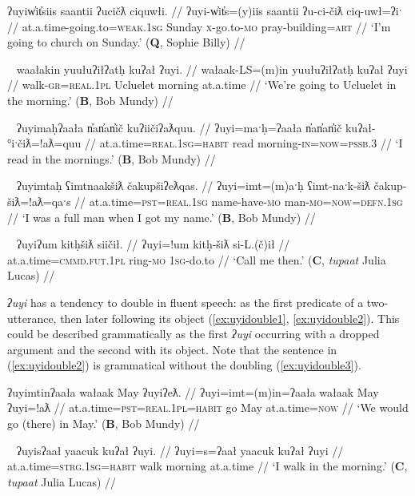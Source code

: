 \ex \label{ex:uyin}
\begingl
\glpreamble ʔuyiw̓it̓siis saantii ʔucičƛ ciquwłi. //
\gla ʔuyi-w̓it̓s=(y)iis saantii ʔu-ci-čiƛ ciq-uwł=ʔiˑ //
\glb at.a.time-going.to=\textsc{weak.1sg} Sunday \textsc{x}-go.to-\textsc{mo} pray-building=\textsc{art} //
\glft `I'm going to church on Sunday.' (\textbf{Q}, Sophie Billy) //
\endgl
\xe

\ex~ \label{ex:uyiobj}
\begingl
\glpreamble waałakin yuułuʔiłʔatḥ kuʔał ʔuyi. //
\gla wałaak-LS=(m)in yuułuʔiłʔatḥ kuʔał ʔuyi //
\glb walk-\textsc{gr}=\textsc{real.1pl} Ucluelet morning at.a.time //
\glft `We're going to Ucluelet in the morning.' (\textbf{B}, Bob Mundy) //
\endgl
\xe

\ex~ \label{ex:uyipssb}
\begingl
\glpreamble ʔuyimaḥʔaała n̓an̓an̓ič kuʔiičiʔaƛquu. //
\gla ʔuyi=maˑḥ=ʔaała n̓an̓an̓ič kuʔał-°iˑčiƛ=!aƛ=quu //
\glb at.a.time=\textsc{real.1sg}=\textsc{habit} read morning-\textsc{in}=\textsc{now}=\textsc{pssb.3} //
\glft `I read in the mornings.' (\textbf{B}, Bob Mundy) //
\endgl
\xe

\ex~ \label{ex:uyidef}
\begingl
\glpreamble ʔuyimtaḥ ʕimtnaakšiƛ čakupšiʔeƛqas. //
\gla ʔuyi=imt=(m)aˑḥ ʕimt-naˑk-šiƛ čakup-šiƛ=!aƛ=qaˑs //
\glb at.a.time=\textsc{pst}=\textsc{real.1sg} name-have-\textsc{mo} man-\textsc{mo}=\textsc{now}=\textsc{defn.1sg} //
\glft `I was a full man when I got my name.' (\textbf{B}, Bob Mundy) //
\endgl
\xe

\ex~ \label{ex:uyidrop}
\begingl
\glpreamble ʔuyiʔum kitḥšiƛ siičił. //
\gla ʔuyi=!um kitḥ-šiƛ si-L.(č)ił //
\glb at.a.time=\textsc{cmmd.fut.1pl} ring-\textsc{mo} \textsc{1sg}-do.to //
\glft `Call me then.' (\textbf{C}, \textit{tupaat} Julia Lucas) //
\endgl
\xe

\textit{ʔuyi} has a tendency to double in fluent speech: as the first predicate of a two-utterance, then later following its object (\ref{ex:uyidouble1}, \ref{ex:uyidouble2}). This could be described grammatically as the first \textit{ʔuyi} occurring with a dropped argument and the second with its object.  Note that the sentence in (\ref{ex:uyidouble2}) is grammatical without the doubling (\ref{ex:uyidouble3}).

\ex \label{ex:uyidouble1}
\begingl
\glpreamble ʔuyimtinʔaała wałaak May ʔuyiʔeƛ. //
\gla ʔuyi=imt=(m)in=ʔaała wałaak May ʔuyi=!aƛ //
\glb at.a.time=\textsc{pst}=\textsc{real.1pl}=\textsc{habit} go May at.a.time=\textsc{now} //
\glft `We would go (there) in May.' (\textbf{B}, Bob Mundy) //
\endgl
\xe

\ex~ \label{ex:uyidouble2}
\begingl
\glpreamble ʔuyisʔaał yaacuk kuʔał ʔuyi. //
\gla ʔuyi=s=ʔaał yaacuk kuʔał ʔuyi //
\glb at.a.time=\textsc{strg.1sg}=\textsc{habit} walk morning at.a.time //
\glft `I walk in the morning.' (\textbf{C}, \textit{tupaat} Julia Lucas) //
\endgl
\xe


